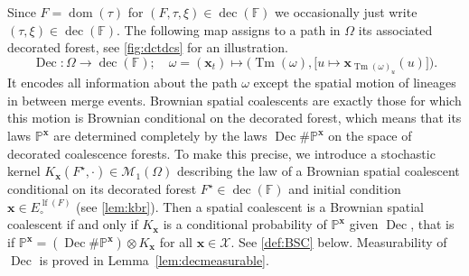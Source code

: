 \documentclass[reqno,draft]{amsart}
\numberwithin{equation}{section}
\theoremstyle{plain}
\theoremstyle{remark}
\renewcommand{\P}{\mathbb{P}} %
\DeclareMathOperator{\dom}{dom}
\DeclareMathOperator{\lf}{lf}
\DeclareMathOperator{\dcb}{dec}
\DeclareMathOperator{\tm}{Tm}
\DeclareMathOperator{\dc}{Dec}
\begin{document}
Since $F = \dom(\tau)$ for $(F,\tau,\xi) \in \dcb(\mathbb{F})$ we occasionally just write $(\tau,\xi) \in \dcb(\mathbb{F})$. The following map assigns to a path in $\Omega$ its associated decorated forest, see \cref{fig:dctdcs} for an illustration.
\begin{equation}\label{eq:defdc}
    \dc \colon \Omega \to \dcb(\mathbb{F});\quad \omega = (\boldsymbol x_t) \mapsto \Big(\tm(\omega), \big[ u \mapsto \boldsymbol x_{\tm(\omega)_u}(u)\big] \Big).
\end{equation}
It encodes all information about the path $\omega$ except the spatial motion of lineages in between merge events. Brownian spatial coalescents are exactly those for which this motion is Brownian conditional on the decorated forest, which means that its laws $\P^{\boldsymbol x}$ are determined completely by the laws $\dc \# \P^{\boldsymbol x}$ on the space of decorated coalescence forests. To make this precise, we introduce a stochastic kernel $K_{\boldsymbol x}(F^\star,\cdot )\in \mathcal{M}_1(\Omega)$ describing the law of a Brownian spatial coalescent conditional on its decorated forest $F^\star \in \dcb(\mathbb{F})$ and initial condition $\boldsymbol x \in E^{\lf(F)}_\circ $ (see \cref{lem:kbr}). Then a spatial coalescent is a Brownian spatial coalescent if and only if $K_{\boldsymbol x}$ is a conditional probability of $\P^{\boldsymbol x}$ given $\dc$, that is if $\P^{\boldsymbol x} = (\dc\# \P^{\boldsymbol x}) \otimes K_{\boldsymbol x}$ for all $\boldsymbol x\in \mathcal{X}$. See \cref{def:BSC} below. Measurability of $\dc$ is proved in Lemma~\ref{lem:decmeasurable}.
\end{document}
